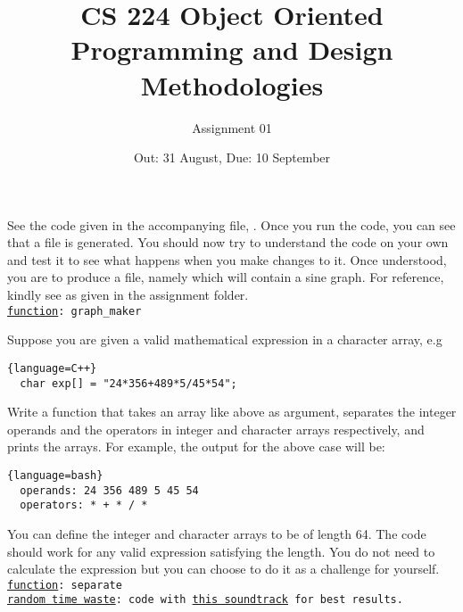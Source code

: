 \documentclass[a4paper,12pt]{exam}
\title{CS 224 Object Oriented Programming and Design Methodologies}
\author{Assignment 01}
\date{Out: 31 August, Due: 10 September}
\newcommand{\func}[1]{\\{\tt \ul{function}: #1}}
\begin{document}
\maketitle
\thispagestyle{empty}

\begin{questions}

See the code given in the accompanying file, . Once you run the code, you can see that a file	 is generated. You should now try to understand the code on your own and test it to see what happens when you make changes to it. Once understood, you are to produce a file, namely  which will contain a sine graph. For reference, kindly see  as given in the assignment folder.
\func{graph\_maker}

Suppose you are given a valid mathematical expression in a character array, e.g
\begin{lstlisting}{language=C++}
  char exp[] = "24*356+489*5/45*54";
\end{lstlisting}
Write a function that takes an array like above as argument, separates the integer operands and the operators in integer and character arrays respectively, and prints the arrays. For example, the output for the above case will be:
\begin{lstlisting}{language=bash}
  operands: 24 356 489 5 45 54
  operators: * + * / *
\end{lstlisting}
You can define the integer and character arrays to be of length 64. The code should work for any valid expression satisfying the length. You do not need to calculate the expression but you can choose to do it as a challenge for yourself.
\func{separate}\\
\tt{\ul{random time waste}: code with \href{https://www.youtube.com/watch?v=yvEp3OjoEGo}{this soundtrack} for best results.}
\end{questions}
\end{document}
